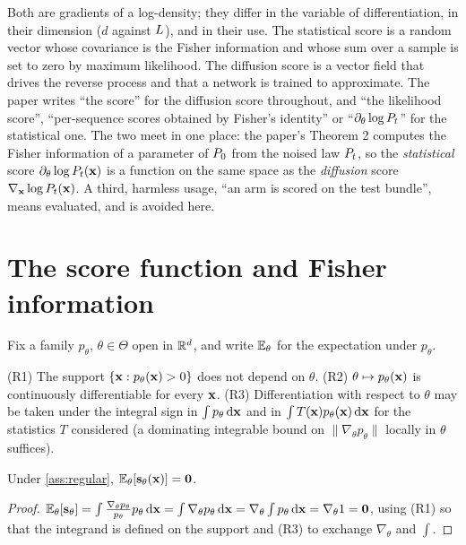 Both are gradients of a log-density; they differ in the variable of
differentiation, in their dimension ($d$ against $L$), and in their use. The
statistical score is a random vector whose covariance is the Fisher information and
whose sum over a sample is set to zero by maximum likelihood. The diffusion score is
a vector field that drives the reverse process and that a network is trained to
approximate. The paper writes ``the score'' for the diffusion score throughout, and
``the likelihood score'', ``per-sequence scores obtained by Fisher's identity'' or
``$\partial_\theta\log P_t$'' for the statistical one. The two meet in one place: the
paper's Theorem 2 computes the Fisher information of a parameter of $P_0$ from the
noised law $P_t$, so the \emph{statistical} score $\partial_\theta\log P_t(\mathbf{x})$ is
a function on the same space as the \emph{diffusion} score $\nabla_{\mathbf{x}}\log P_t(\mathbf{x})$.
A third, harmless usage, ``an arm is scored on the test bundle'', means evaluated,
and is avoided here.

\section{The score function and Fisher information}

Fix a family $p_\theta$, $\theta\in\Theta$ open in $\mathbb{R}^d$, and write
$\mathbb{E}_\theta$ for the expectation under $p_\theta$.

\begin{assumption}[Regularity]
\label{ass:regular}
(R1) The support $\{\mathbf{x}:p_\theta(\mathbf{x})>0\}$ does not depend on $\theta$. (R2) $\theta\mapsto p_\theta(\mathbf{x})$
is continuously differentiable for every $\mathbf{x}$. (R3) Differentiation with respect to
$\theta$ may be taken under the integral sign in $\int p_\theta\,\mathrm{d}\mathbf{x}$ and in
$\int T(\mathbf{x})p_\theta(\mathbf{x})\,\mathrm{d}\mathbf{x}$ for the statistics $T$ considered (a dominating
integrable bound on $\|\nabla_\theta p_\theta\|$ locally in $\theta$ suffices).
\end{assumption}

\begin{proposition}
\label{prop:score-mean-zero}
Under \cref{ass:regular}, $\mathbb{E}_\theta[\mathbf{s}_\theta(\mathbf{x})]=\mathbf{0}$.
\end{proposition}
\begin{proof}
$\mathbb{E}_\theta[\mathbf{s}_\theta]=\int\frac{\nabla_\theta p_\theta}{p_\theta}p_\theta\,\mathrm{d}\mathbf{x}=\int\nabla_\theta p_\theta\,\mathrm{d}\mathbf{x}=\nabla_\theta\int p_\theta\,\mathrm{d}\mathbf{x}=\nabla_\theta1=\mathbf{0}$,
using (R1) so that the integrand is defined on the support and (R3) to exchange
$\nabla_\theta$ and $\int$.
\end{proof}

